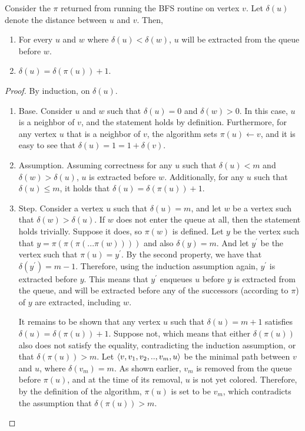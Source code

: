   \begin{claim}
    Consider the $\pi$ returned from running the BFS routine on vertex $v$. Let $\delta(u)$ denote the distance between $u$ and $v$. Then,
\begin{enumerate}
    \item For every $u$ and $w$ where $\delta(u) < \delta(w)$, $u$ will be extracted from the queue before $w$.
    \item $\delta(u) = \delta(\pi(u)) + 1$. 
  \end{enumerate}
  \end{claim}
  \begin{proof}
    By induction, on $\delta(u)$.
    \begin{enumerate}
      \item  Base. Consider $u$ and $w$ such that $\delta(u) = 0$ and $\delta(w) > 0$. In this case, $u$ is a neighbor of $v$, and the statement holds by definition. Furthermore, for any vertex $u$ that is a neighbor of $v$, the algorithm sets $\pi(u) \leftarrow v$, and it is easy to see that $\delta(u) = 1 = 1 + \delta(v)$.
      \item Assumption. Assuming correctness for any $u$ such that $\delta(u) < m$ and $\delta(w) > \delta(u)$, $u$ is extracted before $w$. Additionally, for any $u$ such that $\delta(u) \le m$, it holds that $\delta(u) = \delta(\pi(u)) + 1$.
      \item Step. Consider a vertex $u$ such that $\delta(u) = m$, and let $w$ be a vertex such that $\delta(w) > \delta(u)$. If $w$ does not enter the queue at all, then the statement holds trivially. Suppose it does, so $\pi(w)$ is defined. Let $y$ be the vertex such that $y = \pi(\pi(\pi(...\pi(w))))$ and also $\delta(y) = m$. And let $y^{\prime}$ be the vertex such that $\pi(u) = y^{\prime}$. By the second property, we have that $\delta(y^\prime) = m - 1$. Therefore, using the induction assumption again, $y^{\prime}$ is extracted before $y$. This means that $y^\prime$ enqueues $u$ before $y$ is extracted from the queue, and will be extracted before any of the successors (according to $\pi$) of $y$ are extracted, including $w$.
        
It remains to be shown that any vertex $u$ such that $\delta(u) = m+1$ satisfies $\delta(u) = \delta(\pi(u)) + 1$. Suppose not, which means that either $\delta(\pi(u))$ also does not satisfy the equality, contradicting the induction assumption, or that $\delta(\pi(u)) > m$. Let $\braket{v,v_1 ,v_2, .. ,v_{m},u}$ be the minimal path between $v$ and $u$, where $\delta(v_m) = m$. As shown earlier, $v_m$ is removed from the queue before $\pi(u)$, and at the time of its removal, $u$ is not yet colored. Therefore, by the definition of the algorithm, $\pi(u)$ is set to be $v_m$, which contradicts the assumption that $\delta(\pi(u)) > m$.
    \end{enumerate}
  \end{proof}

